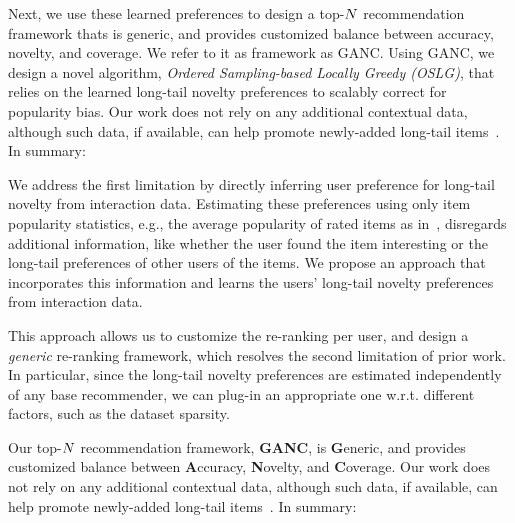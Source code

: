 Next, we use these learned preferences  to design a  top-$N$ recommendation framework thats is generic, and provides customized balance between accuracy, novelty, and coverage. We refer to it as framework as GANC.  Using GANC, we design a novel algorithm, {\it Ordered Sampling-based Locally Greedy (OSLG)\/}, that relies on the learned long-tail novelty preferences  to scalably correct for popularity bias. Our work does not rely on any additional contextual data, although such data, if available, can help promote newly-added long-tail items~\cite{agarwal2009regression,Saveski:2014:ICR:2645710.2645751}. In summary:
\fi

We address the first limitation by directly inferring  user  preference for long-tail novelty  from interaction data.   Estimating these  preferences  using only item popularity statistics, e.g., the average popularity of rated items as in~\cite{jugovac2017efficient}, disregards additional information, like whether the user found the item interesting or the long-tail preferences of other users  of the items. We propose an approach that  incorporates  this information and  learns the users' long-tail novelty preferences from interaction data.

This approach allows us to customize the re-ranking  per user, and  design a \textit{generic} re-ranking framework, which resolves the second limitation of prior work. In particular, since the long-tail novelty preferences are estimated independently of any base recommender, we can  plug-in an appropriate one w.r.t. different factors, such as the dataset sparsity.

Our top-$N$ recommendation framework, \textbf{GANC}, is \textbf{G}eneric, and provides customized balance between \textbf{A}ccuracy, \textbf{N}ovelty, and \textbf{C}overage. %
Our work does not rely on any additional contextual data, although such data, if available, can help promote newly-added long-tail items~\cite{agarwal2009regression,Saveski:2014:ICR:2645710.2645751}. In summary:

%


